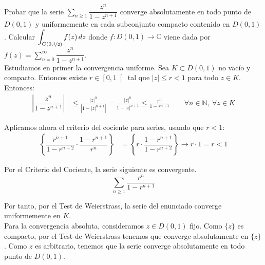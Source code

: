 \documentclass[12pt]{article}
\begin{document}
    \newpage
    \setcounter{ejercicio}{0}

    \begin{ejercicio}[3.5 puntos]
        Probar que la serie $\displaystyle \sum\limits_{n\geq 1} \dfrac{z^n}{1-z^{n+1}}$ converge absolutamente en todo punto de $D(0, 1)$ y uniformemente en cada subconjunto compacto contenido en $D(0, 1)$. Calcular $\displaystyle \int_{C(0,\nicefrac{1}{2})} f(z) \, dz$ donde $f:D(0, 1) \to \mathbb{C}$ viene dada por $f(z) = \sum\limits_{n=0}^{\infty} \dfrac{z^n}{1-z^{n+1}}$.\\

        Estudiamos en primer la convergencia uniforme. Sea $K\subset D(0, 1)$ no vacío y compacto. Entonces existe $r \in \left[0,1\right[$ tal que $|z|\leq r<1$ para todo $z \in K$. Entonces:
        \begin{align*}
            \left|\dfrac{z^n}{1-z^{n+1}}\right| &\leq \frac{|z|^n}{\left|1 - |z|^{n+1}\right|} = \frac{|z|^n}{1 - |z|^{n+1}}\leq \frac{r^n}{1 - r^{n+1}} \qquad \forall n \in \mathbb{N},~\forall z \in K
        \end{align*}

        Aplicamos ahora el criterio del cociente para series, usando que $r<1$:
        \begin{align*}
            \left\{\dfrac{r^{n+1}}{1 - r^{n+2}} \cdot \dfrac{1 - r^{n+1}}{r^n} \right\}&= \left\{r \cdot \dfrac{1 - r^{n+1}}{1 - r^{n+2}}\right\} \to r\cdot 1 = r<1
        \end{align*}
        
        Por el Criterio del Cociente, la serie siguiente es convergente.
        \begin{equation*}
            \sum_{n \geq 1} \frac{r^n}{1 - r^{n+1}}
        \end{equation*}
        
        Por tanto, por el Test de Weierstrass, la serie del enunciado converge uniformemente en $K$.\\

        Para la convergencia absoluta, consideramos $z\in D(0,1)$ fijo. Como $\{z\}$ es compacto, por el Test de Weierstrass tenemos que converge absolutamente en $\{z\}$. Como $z$ es arbitrario, tenemos que la serie converge absolutamente en todo punto de $D(0, 1)$.\\



\end{ejercicio}
\end{document}
